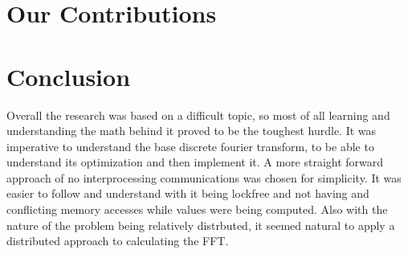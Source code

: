 \documentclass[journal]{IEEEtran}
\begin{document}
\section{Our Contributions}

\section{Conclusion}
	\par{
		Overall the research was based on a difficult topic, so most of all learning and understanding the 
		math behind it proved to be the toughest hurdle. It was imperative to understand the base discrete 
		fourier transform, to be able to understand its optimization and then implement it. A more straight 
		forward approach of no interprocessing communications was chosen for simplicity. It was easier to 
		follow and understand with it being lockfree and not having and conflicting memory accesses while 
		values were being computed. Also with the nature of the problem being relatively distrbuted, it 
		seemed natural to apply a distributed approach to calculating the FFT.
	}

\medskip


\end{document}
